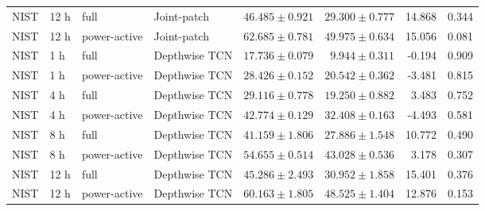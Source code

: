 \begin{longtable}{lll l rrrr}
NIST & 12 h & full & Joint-patch & $46.485\pm0.921$ & $29.300\pm0.777$ & 14.868 & 0.344\\
NIST & 12 h & power-active & Joint-patch & $62.685\pm0.781$ & $49.975\pm0.634$ & 15.056 & 0.081\\
NIST & 1 h & full & Depthwise TCN & $17.736\pm0.079$ & $9.944\pm0.311$ & -0.194 & 0.909\\
NIST & 1 h & power-active & Depthwise TCN & $28.426\pm0.152$ & $20.542\pm0.362$ & -3.481 & 0.815\\
NIST & 4 h & full & Depthwise TCN & $29.116\pm0.778$ & $19.250\pm0.882$ & 3.483 & 0.752\\
NIST & 4 h & power-active & Depthwise TCN & $42.774\pm0.129$ & $32.408\pm0.163$ & -4.493 & 0.581\\
NIST & 8 h & full & Depthwise TCN & $41.159\pm1.806$ & $27.886\pm1.548$ & 10.772 & 0.490\\
NIST & 8 h & power-active & Depthwise TCN & $54.655\pm0.514$ & $43.028\pm0.536$ & 3.178 & 0.307\\
NIST & 12 h & full & Depthwise TCN & $45.286\pm2.493$ & $30.952\pm1.858$ & 15.401 & 0.376\\
NIST & 12 h & power-active & Depthwise TCN & $60.163\pm1.805$ & $48.525\pm1.404$ & 12.876 & 0.153\\
\bottomrule\end{longtable}
